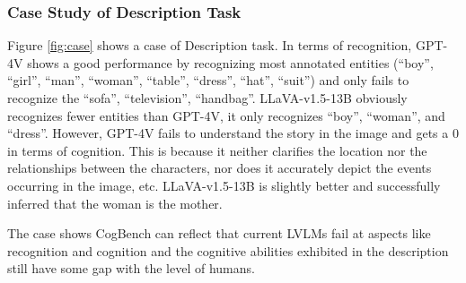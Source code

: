 \subsubsection{Case Study of Description Task}
Figure \ref{fig:case} shows a case of Description task.
In terms of recognition, GPT-4V shows a good performance by recognizing most annotated entities (``boy'', ``girl'', ``man'', ``woman'', ``table'', ``dress'', ``hat'', ``suit'') and only fails to recognize the ``sofa'', ``television'', ``handbag''.
LLaVA-v1.5-13B obviously recognizes fewer entities than GPT-4V, it only recognizes ``boy'', ``woman'', and ``dress''.
However, GPT-4V fails to understand the story in the image and gets a 0 in terms of cognition.
This is because it neither clarifies the location nor the relationships between the characters, nor does it accurately depict the events occurring in the image, etc.
LLaVA-v1.5-13B is slightly better and successfully inferred that the woman is the mother.


The case shows CogBench can reflect that current LVLMs fail at aspects like recognition and cognition and the cognitive abilities exhibited in the description still have some gap with the level of humans.


